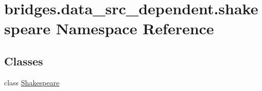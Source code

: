 \hypertarget{namespacebridges_1_1data__src__dependent_1_1shakespeare}{}\section{bridges.\+data\+\_\+src\+\_\+dependent.\+shakespeare Namespace Reference}
\label{namespacebridges_1_1data__src__dependent_1_1shakespeare}
\subsection*{Classes}
\begin{DoxyCompactItemize}
\item 
class \hyperlink{classbridges_1_1data__src__dependent_1_1shakespeare_1_1_shakespeare}{Shakespeare}
\end{DoxyCompactItemize}
